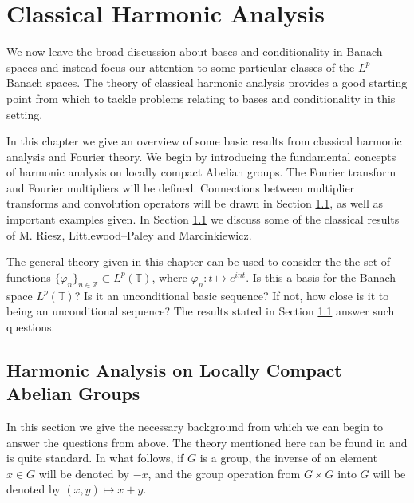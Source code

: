 \documentclass[mstat,12pt]{unswthesis}  %
\newcommand{\T}{\mathbb{T}}
\newcommand{\Z}{\mathbb{Z}}
\numberwithin{equation}{section}
\begin{document}

\chapter{Classical Harmonic Analysis}\label{cha}





We now
leave the broad discussion about bases and conditionality in Banach spaces and
instead focus our attention to some particular classes of the $L^p$ Banach
spaces. The theory of classical harmonic analysis provides a good starting point
from which to tackle problems relating to bases and conditionality in this 
setting.

In this chapter we give an overview of some basic results from classical
harmonic analysis and Fourier theory.
We begin by introducing the fundamental concepts of harmonic analysis on locally
compact Abelian groups. The Fourier transform and Fourier multipliers will be
defined. Connections between multiplier transforms and convolution operators 
will
be drawn in Section \ref{lca}, as well as important examples given. In
Section \ref{lca} we discuss some of the classical results of M. Riesz,
Littlewood--Paley and Marcinkiewicz.

The general theory given in this chapter can be used to consider the
the set of functions $\{\varphi_n\}_{n\in\Z}\subset L^p(\T)$, where
$\varphi_n:t\mapsto e^{int}$. Is this a basis for the Banach space $L^p(\T)$?
Is it an unconditional basic sequence? If not, how close is it
to being an unconditional sequence? The results stated in Section 
\ref{lca}
answer such questions.




\section{Harmonic Analysis on Locally Compact Abelian Groups}\label{lca}


In this section we give the necessary background from which we can begin to
answer
the questions from
above. The theory mentioned here can be found in \cite{Katznelson}
and is quite 
standard. In what follows, if $G$ is a group, the inverse of an
element $x\in G$ will be denoted by $-x$, and the group operation from
$G\times G$ into $G$ will be denoted by $(x,y)\mapsto x+y$. 
\end{document}
